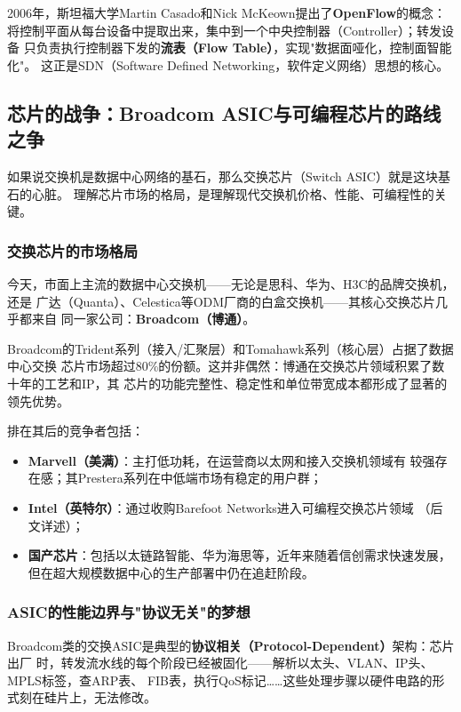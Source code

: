 2006年，斯坦福大学Martin Casado和Nick McKeown提出了\textbf{OpenFlow}的概念：
将控制平面从每台设备中提取出来，集中到一个中央控制器（Controller）；转发设备
只负责执行控制器下发的\textbf{流表（Flow Table）}，实现"数据面哑化，控制面智能化"。
这正是SDN（Software Defined Networking，软件定义网络）思想的核心。

\subsection{芯片的战争：Broadcom ASIC与可编程芯片的路线之争}

如果说交换机是数据中心网络的基石，那么交换芯片（Switch ASIC）就是这块基石的心脏。
理解芯片市场的格局，是理解现代交换机价格、性能、可编程性的关键。

\subsubsection{交换芯片的市场格局}

今天，市面上主流的数据中心交换机——无论是思科、华为、H3C的品牌交换机，还是
广达（Quanta）、Celestica等ODM厂商的白盒交换机——其核心交换芯片几乎都来自
同一家公司：\textbf{Broadcom（博通）}。

Broadcom的Trident系列（接入/汇聚层）和Tomahawk系列（核心层）占据了数据中心交换
芯片市场超过80\%的份额。这并非偶然：博通在交换芯片领域积累了数十年的工艺和IP，其
芯片的功能完整性、稳定性和单位带宽成本都形成了显著的领先优势。

排在其后的竞争者包括：
\begin{itemize}
  \item \textbf{Marvell（美满）}：主打低功耗，在运营商以太网和接入交换机领域有
    较强存在感；其Prestera系列在中低端市场有稳定的用户群；
  \item \textbf{Intel（英特尔）}：通过收购Barefoot Networks进入可编程交换芯片领域
    （后文详述）；
  \item \textbf{国产芯片}：包括以太链路智能、华为海思等，近年来随着信创需求快速发展，
    但在超大规模数据中心的生产部署中仍在追赶阶段。
\end{itemize}

\subsubsection{ASIC的性能边界与"协议无关"的梦想}

Broadcom类的交换ASIC是典型的\textbf{协议相关（Protocol-Dependent）}架构：芯片出厂
时，转发流水线的每个阶段已经被固化——解析以太头、VLAN、IP头、MPLS标签，查ARP表、
FIB表，执行QoS标记……这些处理步骤以硬件电路的形式刻在硅片上，无法修改。

